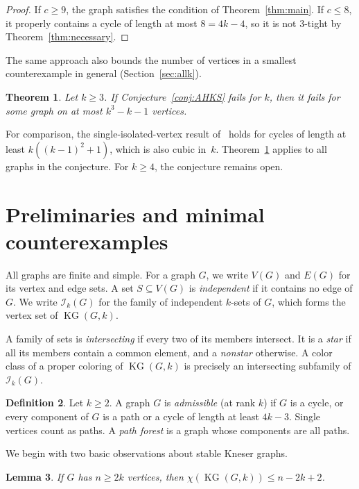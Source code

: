 \documentclass[11pt]{amsart}
\newtheorem{theorem}{Theorem}[section]
\newtheorem{lemma}[theorem]{Lemma}
\theoremstyle{definition}
\newtheorem{definition}[theorem]{Definition}
\theoremstyle{remark}
\numberwithin{equation}{section}
\newcommand{\KG}{\operatorname{KG}}
\begin{document}
\begin{proof}
If $c\ge9$, the graph satisfies the condition of Theorem~\ref{thm:main}. If
$c\le8$, it properly contains a cycle of length at most $8=4k-4$, so it is not
$3$-tight by Theorem~\ref{thm:necessary}.
\end{proof}

The same approach also bounds the number of vertices in a smallest
counterexample in general (Section~\ref{sec:allk}).

\begin{theorem}\label{thm:allk}
Let $k\ge3$. If Conjecture~\ref{conj:AHKS} fails for $k$, then it fails for
some graph on at most $k^3-k-1$ vertices.
\end{theorem}

For comparison, the single-isolated-vertex result of~\cite{AFTD} holds for
cycles of length at least $k((k-1)^2+1)$, which is also cubic in~$k$.
Theorem~\ref{thm:allk} applies to all graphs in the conjecture. For $k\ge4$,
the conjecture remains open.

\section{Preliminaries and minimal counterexamples}\label{sec:prelim}

All graphs are finite and simple. For a graph $G$, we write $V(G)$ and $E(G)$
for its vertex and edge sets. A set $S\subseteq V(G)$ is \emph{independent} if
it contains no edge of $G$. We write $\mathcal I_k(G)$ for the family of
independent $k$-sets of $G$, which forms the vertex set of $\KG(G,k)$.

A family of sets is \emph{intersecting} if every two of its members intersect.
It is a \emph{star} if all its members contain a common element, and a
\emph{nonstar} otherwise. A color class of a proper coloring of $\KG(G,k)$ is
precisely an intersecting subfamily of $\mathcal I_k(G)$.

\begin{definition}
Let $k\ge2$. A graph $G$ is \emph{admissible} (at rank $k$) if $G$ is a cycle,
or every component of $G$ is a path or a cycle of length at least $4k-3$.
Single vertices count as paths. A \emph{path forest} is a graph whose
components are all paths.
\end{definition}

We begin with two basic observations about stable Kneser graphs.

\begin{lemma}\label{lem:upper}
If $G$ has $n\ge2k$ vertices, then $\chi(\KG(G,k))\le n-2k+2$.
\end{lemma}
\end{document}
